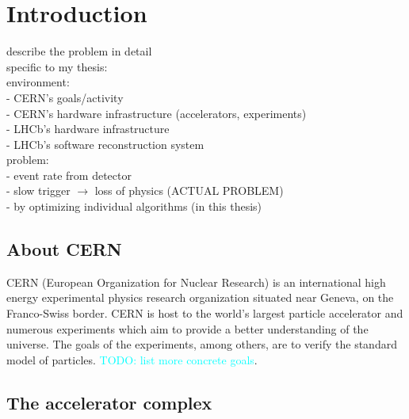 \documentclass[12pt]{article}
\begin{document}
\newpage
\section{Introduction}

\color{red}
describe the problem in detail \\
specific to my thesis: \\
environment: \\
- CERN's goals/activity \\
- CERN's hardware infrastructure (accelerators, experiments) \\
- LHCb's hardware infrastructure \\
- LHCb's software reconstruction system \\
problem: \\
- event rate from detector \\
- slow trigger $\rightarrow$ loss of physics (ACTUAL PROBLEM) \\
- by optimizing individual algorithms (in this thesis) \\
\color{black}
\vspace{1.5pc}

\subsection{About CERN}

CERN (European Organization for Nuclear Research) is an international high energy experimental physics research organization situated near Geneva, on the Franco-Swiss border. CERN is host to the world's largest particle accelerator and numerous experiments which aim to provide a better understanding of the universe. The goals of the experiments, among others, are to verify the standard model of particles. \textcolor{cyan}{TODO: list more concrete goals}.
\cite{cern_about}


\subsection{The accelerator complex \cite{cern_accel_complex}}
\end{document}
